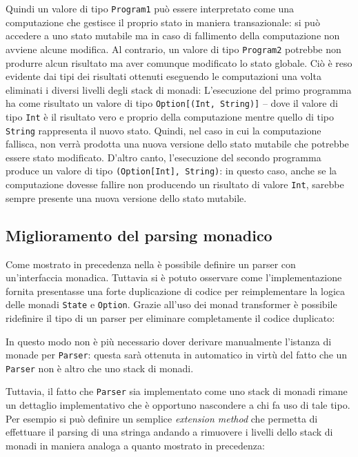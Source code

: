 Quindi un valore di tipo \lstinline{Program1} può essere interpretato come una computazione che gestisce il proprio stato in maniera transazionale: si può accedere a uno stato mutabile ma in caso di fallimento della computazione non avviene alcune modifica. Al contrario, un valore di tipo \lstinline{Program2} potrebbe non produrre alcun risultato ma aver comunque modificato lo stato globale. Ciò è reso evidente dai tipi dei risultati ottenuti eseguendo le computazioni una volta eliminati i diversi livelli degli stack di monadi:
L'esecuzione del primo programma ha come risultato un valore di tipo \lstinline{Option[(Int, String)]} -- dove il valore di tipo \lstinline{Int} è il risultato vero e proprio della computazione mentre quello di tipo \lstinline{String} rappresenta il nuovo stato. Quindi, nel caso in cui la computazione fallisca, non verrà prodotta una nuova versione dello stato mutabile che potrebbe essere stato modificato.
D'altro canto, l'esecuzione del secondo programma produce un valore di tipo \lstinline{(Option[Int], String)}: in questo caso, anche se la computazione dovesse fallire non producendo un risultato di valore \lstinline{Int}, sarebbe sempre presente una nuova versione dello stato mutabile.

\subsection{Miglioramento del parsing monadico}
Come mostrato in precedenza nella  è possibile definire un parser con un'interfaccia monadica. Tuttavia si è potuto osservare come l'implementazione fornita presentasse una forte duplicazione di codice per reimplementare la logica delle monadi \lstinline{State} e \lstinline{Option}.
Grazie all'uso dei monad transformer è possibile ridefinire il tipo di un parser per eliminare completamente il codice duplicato:

In questo modo non è più necessario dover derivare manualmente l'istanza di monade per \lstinline{Parser}: questa sarà ottenuta in automatico in virtù del fatto che un \lstinline{Parser} non è altro che uno stack di monadi.

Tuttavia, il fatto che \lstinline{Parser} sia implementato come uno stack di monadi rimane un dettaglio implementativo che è opportuno nascondere a chi fa uso di tale tipo. Per esempio si può definire un semplice \emph{extension method} che permetta di effettuare il parsing di una stringa andando a rimuovere i livelli dello stack di monadi in maniera analoga a quanto mostrato in precedenza:

